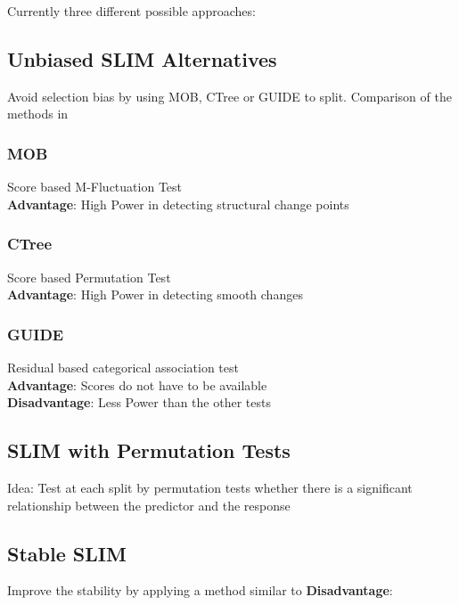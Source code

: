 Currently three different possible approaches:
\subsection{Unbiased SLIM Alternatives}
Avoid selection bias by using MOB, CTree or GUIDE to split.
Comparison of the methods in \citep{Schlosser.24.06.2019}

\subsubsection{MOB}
Score based M-Fluctuation Test \\
\textbf{Advantage}: High Power in detecting structural change points
\subsubsection{CTree}
Score based Permutation Test \\
\textbf{Advantage}: High Power in detecting smooth changes

\subsubsection{GUIDE}
Residual based categorical association test\\
\textbf{Advantage}: Scores do not have to be available\\
\textbf{Disadvantage}: Less Power than the other tests




\subsection{SLIM with Permutation Tests}
Idea: \citep{.4581}
Test at each split by permutation tests whether there is a significant relationship between the predictor and the response

\subsection{Stable SLIM}
Improve the stability by applying a method similar to \citep{Zhou.2018}
\textbf{Disadvantage}: 
